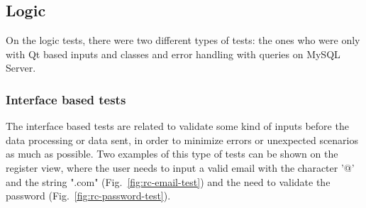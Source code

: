 \subsection{Logic}
\label{subsec:logic-test-rc}

On the logic tests, there were two different types of tests: the ones who were only with Qt based inputs and classes and error handling with queries on MySQL Server.

\subsubsection{Interface based tests}
The interface based tests are related to validate some kind of inputs before the data processing or data sent, in order to minimize errors or unexpected scenarios as much as possible. Two examples of this type of tests can be shown on the register view, where the user needs to input a valid email with the character '@' and the string ".com" (Fig.~\ref{fig:rc-email-test}) and the need to validate the password (Fig.~\ref{fig:rc-password-test}).
%
